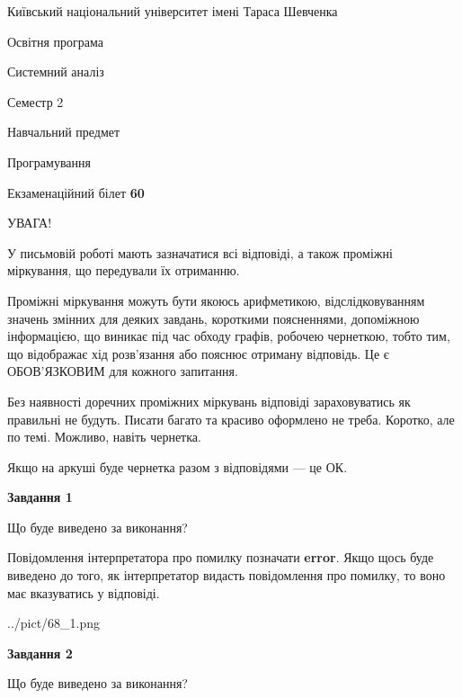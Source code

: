 \documentclass[12pt, ukrainian]{article}
\begin{document}
{{\begin {small}\par
{ \center  Київський національний університет імені Тараса Шевченка \par}
{\parbox {5 cm}{Освітня програма \hfill}{\parbox {7 cm}{Системний аналіз \hfill}}\parbox {6 cm}{\hfill Семестр 2}}\par
{\parbox {5 cm} {Навчальний предмет \hfill}\parbox {7 cm}{Програмування \hfill}\parbox {6cm}{\hfill}\par}\vspace{-7pt} \end{small}}{\center Екзаменаційний білет \No \textbf
{ 60 }\par}}
{
\begin {large}
УВАГА!

У письмовій роботі мають зазначатися всі відповіді, а також проміжні міркування, що передували їх отриманню.

Проміжні міркування можуть бути якоюсь арифметикою, відслідковуванням зна\-чень змінних для деяких завдань,
короткими поясненнями, допоміжною інформацією, що виникає під час обходу графів, робочею чернеткою,
тобто тим, що відображає хід розв’язання або пояснює отриману відповідь.
Це є ОБОВ’ЯЗКОВИМ для кожного запитання.

Без наявності доречних проміжних міркувань відповіді зараховуватись як правиль\-ні не будуть.
Писати багато та красиво оформлено не треба. Коротко, але по темі. Можли\-во, навіть чернетка.

Якщо на аркуші буде чернетка разом з відповідями --- це ОК.

\newpage

{\begin {center}\textbf{Завдання 1}\end {center}}\par
Що буде виведено за виконання?

Повідомлення інтерпретатора про помилку позначати \textbf{error}.
Якщо щось буде виведено до того, як інтерпретатор видасть повідомлення про помилку, 
то воно має вказуватись у відповіді. \par


\begin{center}
	{../pict/68_1.png}
\end{center}
\newpage

{\begin {center}\textbf{Завдання 2}\end {center}}\par
Що буде виведено за виконання?


\end{large}}
\end{document}
